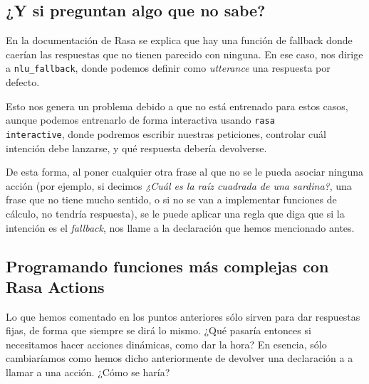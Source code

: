 \subsection{¿Y si preguntan algo que no sabe?}

En la documentación de Rasa se explica que hay una función de fallback \cite{rasa-fallback} donde caerían las respuestas que no tienen parecido con ninguna. En ese caso, nos dirige a \texttt{nlu\_fallback}, donde podemos definir como \textit{utterance} una respuesta por defecto.

Esto nos genera un problema debido a que no está entrenado para estos casos, aunque podemos entrenarlo de forma interactiva usando \texttt{rasa \\ interactive}, donde podremos escribir nuestras peticiones, controlar cuál intención debe lanzarse, y qué respuesta debería devolverse. 

De esta forma, al poner cualquier otra frase al que no se le pueda asociar ninguna acción (por ejemplo, si decimos \textit{¿Cuál es la raíz cuadrada de una sardina?}, una frase que no tiene mucho sentido, o si no se van a implementar funciones de cálculo, no tendría respuesta), se le puede aplicar una regla que diga que si la intención es el \textit{fallback}, nos llame a la declaración que hemos mencionado antes.

\subsection{Programando funciones más complejas con Rasa Actions}
Lo que hemos comentado en los puntos anteriores sólo sirven para dar respuestas fijas, de forma que siempre se dirá lo mismo. ¿Qué pasaría entonces si necesitamos hacer acciones dinámicas, como dar la hora? En esencia, sólo cambiaríamos como hemos dicho anteriormente de devolver una declaración a a llamar a una acción. ¿Cómo se haría?


